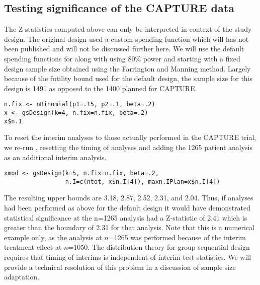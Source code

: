 \subsection{Testing significance of the CAPTURE data}
The Z-statistics computed above can only be interpreted in context of the study design.
The original design used a custom spending function which will has not been published and will not be discussed further here.
We will use the default spending functions for  along with using 80\% power and starting with a fixed design sample size obtained using the Farrington and Manning \cite{FarringtonManning} method.
Largely because of the futility bound used for the default design, the sample size for this design is 1491 as opposed to the 1400 planned for CAPTURE.

\begin{verbatim}
n.fix <- nBinomial(p1=.15, p2=.1, beta=.2)
x <- gsDesign(k=4, n.fix=n.fix, beta=.2)
x$n.I
\end{verbatim}

To reset the interim analyses to those actually performed in the CAPTURE trial, we re-run , resetting the timing of analyses and adding the 1265 patient analysis as an additional interim analysis.
\begin{verbatim}
xmod <- gsDesign(k=5, n.fix=n.fix, beta=.2, 
                 n.I=c(ntot, x$n.I[4]), maxn.IPlan=x$n.I[4])
\end{verbatim}
The resulting upper bounds are 3.18, 2.87, 2.52, 2.31, and 2.04.
Thus, if analyses had been performed as above for the default design it would have demonstrated statistical significance at the n=1265 analysis had a Z-statistic of 2.41 which is greater than the boundary of 2.31 for that analysis.
Note that this is a numerical example only, as the analysis at $n$=1265 was performed because of the interim treatment effect at $n$=1050.
The distribution theory for group sequential design requires that timing of interims is independent of interim test statistics.
We will provide a technical resolution of this problem in a discussion of sample size adaptation.

